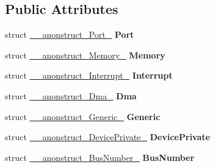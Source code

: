\subsection*{Public Attributes}
\begin{DoxyCompactItemize}
\item 
\hypertarget{union____anonunion__u__24_affcf3ab5a10f945e915e05e92e455b3a}{}struct \hyperlink{struct____anonstruct__Port__25}{\+\_\+\+\_\+anonstruct\+\_\+\+Port\+\_} {\bfseries Port}\label{union____anonunion__u__24_affcf3ab5a10f945e915e05e92e455b3a}

\item 
\hypertarget{union____anonunion__u__24_af269bb76bd88528ded1bffd301154f24}{}struct \hyperlink{struct____anonstruct__Memory__26}{\+\_\+\+\_\+anonstruct\+\_\+\+Memory\+\_} {\bfseries Memory}\label{union____anonunion__u__24_af269bb76bd88528ded1bffd301154f24}

\item 
\hypertarget{union____anonunion__u__24_ae4bcc56167303973e74f942f02d820ee}{}struct \hyperlink{struct____anonstruct__Interrupt__27}{\+\_\+\+\_\+anonstruct\+\_\+\+Interrupt\+\_} {\bfseries Interrupt}\label{union____anonunion__u__24_ae4bcc56167303973e74f942f02d820ee}

\item 
\hypertarget{union____anonunion__u__24_ad573c6049c35a744308ca54fc59a3a1a}{}struct \hyperlink{struct____anonstruct__Dma__28}{\+\_\+\+\_\+anonstruct\+\_\+\+Dma\+\_} {\bfseries Dma}\label{union____anonunion__u__24_ad573c6049c35a744308ca54fc59a3a1a}

\item 
\hypertarget{union____anonunion__u__24_aa1d1c3f817b4cea74003810471dbc97e}{}struct \hyperlink{struct____anonstruct__Generic__29}{\+\_\+\+\_\+anonstruct\+\_\+\+Generic\+\_} {\bfseries Generic}\label{union____anonunion__u__24_aa1d1c3f817b4cea74003810471dbc97e}

\item 
\hypertarget{union____anonunion__u__24_a674b3da4fd9f3460708da3d94399b895}{}struct \hyperlink{struct____anonstruct__DevicePrivate__30}{\+\_\+\+\_\+anonstruct\+\_\+\+Device\+Private\+\_} {\bfseries Device\+Private}\label{union____anonunion__u__24_a674b3da4fd9f3460708da3d94399b895}

\item 
\hypertarget{union____anonunion__u__24_ac26fd6e84ef526b1e7b3bb66509d0d13}{}struct \hyperlink{struct____anonstruct__BusNumber__31}{\+\_\+\+\_\+anonstruct\+\_\+\+Bus\+Number\+\_} {\bfseries Bus\+Number}\label{union____anonunion__u__24_ac26fd6e84ef526b1e7b3bb66509d0d13}


\end{DoxyCompactItemize}
